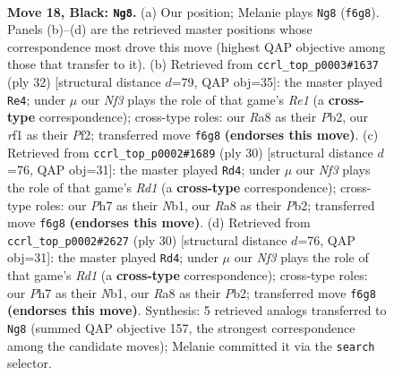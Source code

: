 \documentclass[11pt]{article}
\begin{document}
\clearpage

\begin{figure}[p]\centering
\begin{subfigure}{0.46\textwidth}\centering
\resizebox{\linewidth}{!}{%
\newchessgame
\chessboard[
  setfen={rn1r3b/p3kp1p/P1p2np1/4p3/4P2P/2N5/2P2PB1/R1B2RK1 b - - 2 18},
  showmover=false,
  pgfstyle=straightmove, color=movearrow, markmove={f6-g8}
]}
\caption{}
\end{subfigure}\hfill
\begin{subfigure}{0.46\textwidth}\centering
\resizebox{\linewidth}{!}{%
\newchessgame
\chessboard[
  setfen={r3k3/1pB1bpp1/2p1b2r/5n1p/p7/2NR1N1P/PPP2PP1/4R1K1 w - - 2 17},
  showmover=false,
  pgfstyle=straightmove, color=movearrow, markmove={e1-e4}
]}
\caption{}
\end{subfigure}
\\[4pt]
\begin{subfigure}{0.46\textwidth}\centering
\resizebox{\linewidth}{!}{%
\newchessgame
\chessboard[
  setfen={r3kb2/p1pn1pp1/2p4r/7p/2p5/2B1P1P1/PP2KP1P/RN1R4 w q - 4 16},
  showmover=false,
  pgfstyle=straightmove, color=movearrow, markmove={d1-d4}
]}
\caption{}
\end{subfigure}\hfill
\begin{subfigure}{0.46\textwidth}\centering
\resizebox{\linewidth}{!}{%
\newchessgame
\chessboard[
  setfen={r3kb2/p1pn1pp1/2p4r/7p/2p5/2B1P1P1/PP2KP1P/RN1R4 w q - 4 16},
  showmover=false,
  pgfstyle=straightmove, color=movearrow, markmove={d1-d4}
]}
\caption{}
\end{subfigure}
\caption{\textbf{Move 18, Black: \texttt{Ng8}.} (a) Our position; Melanie plays \texttt{Ng8} (\texttt{f6g8}). Panels (b)--(d) are the retrieved master positions whose correspondence most drove this move (highest QAP objective among those that transfer to it). (b) Retrieved from \texttt{ccrl\_top\_p0003\#1637} (ply 32) [structural distance $d$=79, QAP obj=35]: the master played \texttt{Re4}; under $\mu$ our \emph{Nf3} plays the role of that game's \emph{Re1} (a \textbf{cross-type} correspondence); cross-type roles: our \emph{R}a8 as their \emph{P}b2, our \emph{r}f1 as their \emph{P}f2; transferred move \texttt{f6g8} \textbf{(endorses this move)}. (c) Retrieved from \texttt{ccrl\_top\_p0002\#1689} (ply 30) [structural distance $d$=76, QAP obj=31]: the master played \texttt{Rd4}; under $\mu$ our \emph{Nf3} plays the role of that game's \emph{Rd1} (a \textbf{cross-type} correspondence); cross-type roles: our \emph{P}h7 as their \emph{N}b1, our \emph{R}a8 as their \emph{P}b2; transferred move \texttt{f6g8} \textbf{(endorses this move)}. (d) Retrieved from \texttt{ccrl\_top\_p0002\#2627} (ply 30) [structural distance $d$=76, QAP obj=31]: the master played \texttt{Rd4}; under $\mu$ our \emph{Nf3} plays the role of that game's \emph{Rd1} (a \textbf{cross-type} correspondence); cross-type roles: our \emph{P}h7 as their \emph{N}b1, our \emph{R}a8 as their \emph{P}b2; transferred move \texttt{f6g8} \textbf{(endorses this move)}. Synthesis: 5 retrieved analogs transferred to \texttt{Ng8} (summed QAP objective 157, the strongest correspondence among the candidate moves); Melanie committed it via the \texttt{search} selector.}
\label{fig:thought-m35}
\end{figure}
\end{document}
